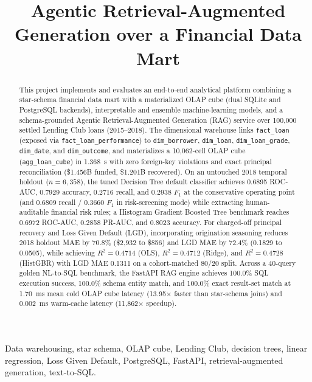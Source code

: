 \documentclass[conference]{IEEEtran}
\begin{document}
\title{Agentic Retrieval-Augmented Generation over a Financial Data Mart}
\author{
}
\maketitle

\begin{abstract}
This project implements and evaluates an end-to-end analytical platform combining a star-schema financial data mart with a materialized OLAP cube (dual SQLite and PostgreSQL backends), interpretable and ensemble machine-learning models, and a schema-grounded Agentic Retrieval-Augmented Generation (RAG) service over 100,000 settled Lending Club loans (2015--2018). The dimensional warehouse links \texttt{fact\_loan} (exposed via \texttt{fact\_loan\_performance}) to \texttt{dim\_borrower}, \texttt{dim\_loan}, \texttt{dim\_loan\_grade}, \texttt{dim\_date}, and \texttt{dim\_outcome}, and materializes a 10,062-cell OLAP cube (\texttt{agg\_loan\_cube}) in 1.368~s with zero foreign-key violations and exact principal reconciliation (\$1.456B funded, \$1.201B recovered). On an untouched 2018 temporal holdout ($n=6{,}358$), the tuned Decision Tree default classifier achieves 0.6895 ROC-AUC, 0.7929 accuracy, 0.2716 recall, and 0.2938 $F_1$ at the conservative operating point (and 0.6809 recall / 0.3660 $F_1$ in risk-screening mode) while extracting human-auditable financial risk rules; a Histogram Gradient Boosted Tree benchmark reaches 0.6972 ROC-AUC, 0.2858 PR-AUC, and 0.8023 accuracy. For charged-off principal recovery and Loss Given Default (LGD), incorporating origination seasoning reduces 2018 holdout MAE by 70.8\% (\$2,932 to \$856) and LGD MAE by 72.4\% (0.1829 to 0.0505), while achieving $R^2=0.4714$ (OLS), $R^2=0.4712$ (Ridge), and $R^2=0.4728$ (HistGBR) with LGD MAE 0.1311 on a cohort-matched 80/20 split. Across a 40-query golden NL-to-SQL benchmark, the FastAPI RAG engine achieves 100.0\% SQL execution success, 100.0\% schema entity match, and 100.0\% exact result-set match at 1.70~ms mean cold OLAP cube latency (13.95$\times$ faster than star-schema joins) and 0.002~ms warm-cache latency (11,862$\times$ speedup).
\end{abstract}

\begin{IEEEkeywords}
Data warehousing, star schema, OLAP cube, Lending Club, decision trees, linear regression, Loss Given Default, PostgreSQL, FastAPI, retrieval-augmented generation, text-to-SQL.
\end{IEEEkeywords}
\end{document}
